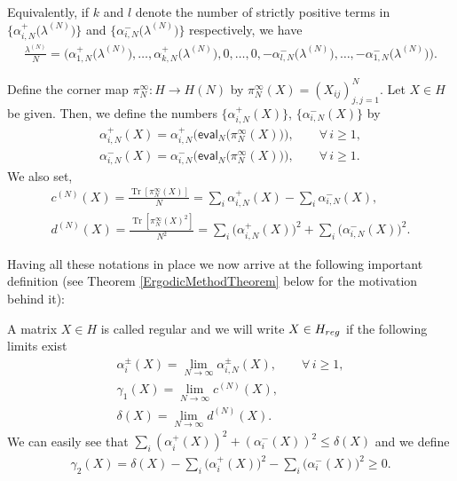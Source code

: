 \documentclass[11pt]{article}
\numberwithin{equation}{section}
\begin{document}
Equivalently, if $k$ and $l$ denote the number of strictly positive terms in $\big\{\alpha_{i,N}^+\big(\lambda^{(N)}\big) \big\}$ and $ \big\{\alpha_{i,N}^-\big(\lambda^{(N)}\big) \big\}$ respectively, we have
\begin{gather*}
\frac{\lambda^{(N)}}{N}=\big(\alpha_{1,N}^+\big(\lambda^{(N)}\big),\dots,\alpha_{k,N}^+\big(\lambda^{(N)}\big),0, \dots, 0, -\alpha_{l,N}^-\big(\lambda^{(N)}\big),\dots,-\alpha_{1,N}^-\big(\lambda^{(N)}\big)\big).
\end{gather*}

 Define the corner map $\pi_N^{\infty}\colon H \to H(N)$ by $\pi_N^{\infty}(X)=(X_{ij})^N_{j,j=1}$. Let $X\in H$ be given. Then, we define the numbers $\big\{\alpha_{i,N}^+(X) \big\}$, $\big\{\alpha_{i,N}^-(X) \big\}$ by
\begin{gather*}
\alpha_{i,N}^+(X)=\alpha_{i,N}^+\big(\mathsf{eval}_N\big(\pi_N^{\infty}(X)\big)\big), \qquad \forall\, i \ge 1,\\
\alpha_{i,N}^-(X)=\alpha_{i,N}^-\big(\mathsf{eval}_N\big(\pi_N^{\infty}(X)\big)\big), \qquad \forall\, i \ge 1.
\end{gather*}
We also set,
\begin{gather*}
c^{(N)}(X) =\frac{\operatorname{Tr}[\pi_N^{\infty}(X)]}{N}=\sum_{i}^{}\alpha_{i,N}^+(X) -\sum_{i}^{}\alpha_{i,N}^-(X),\\
d^{(N)}(X) =\frac{\operatorname{Tr}[\pi_N^{\infty}(X)^2]}{N^2}=\sum_{i}^{}\big(\alpha_{i,N}^+(X)\big)^2+\sum_{i}^{}\big(\alpha_{i,N}^-(X)\big)^2 .
\end{gather*}

Having all these notations in place we now arrive at the following important definition (see Theorem \ref{ErgodicMethodTheorem} below for the motivation behind it):

\begin{Definition}A matrix $X \in H$ is called regular and we will write $X \in H_{{\rm reg}}$ if the following limits exist
\begin{gather*}
\alpha_i^{\pm}(X) =\lim_{N \to \infty}\alpha_{i,N}^{\pm}(X), \qquad \forall\, i \ge 1,\\
\gamma_1(X) =\lim_{N \to \infty}c^{(N)}(X),\\
\delta(X) =\lim_{N \to \infty}d^{(N)}(X).
\end{gather*}
We can easily see that $\sum_{i}^{} (\alpha_{i}^+(X) )^2+ (\alpha_{i}^-(X) )^2 \le \delta(X)$ and we define
\begin{gather*}
\gamma_2(X)=\delta(X)-\sum_{i}^{}\big(\alpha_{i}^+(X)\big)^2-\sum_{i}^{}\big(\alpha_{i}^-(X)\big)^2\ge 0.
\end{gather*}
\end{Definition}
\end{document}
